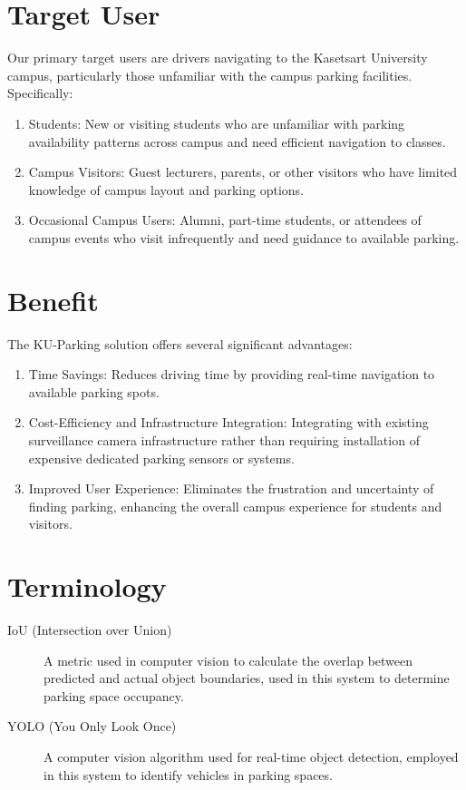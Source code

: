 \section{Target User}
\label{section:target-user}

Our primary target users are drivers navigating to the Kasetsart University campus, particularly those unfamiliar with the campus parking facilities. Specifically:
\begin{enumerate}[leftmargin=80pt]
\item Students: New or visiting students who are unfamiliar with parking availability patterns across campus and need efficient navigation to classes.
\item Campus Visitors: Guest lecturers, parents, or other visitors who have limited knowledge of campus layout and parking options.
\item Occasional Campus Users: Alumni, part-time students, or attendees of campus events who visit infrequently and need guidance to available parking.
\end{enumerate}
\section{Benefit}
\label{section:benefit}

The KU-Parking solution offers several significant advantages:

\begin{enumerate}[leftmargin=80pt]
    \item Time Savings: Reduces driving time by providing real-time navigation to available parking spots.
    
    \item Cost-Efficiency and Infrastructure Integration: Integrating with existing surveillance camera infrastructure rather than requiring installation of expensive dedicated parking sensors or systems.
    
    \item Improved User Experience: Eliminates the frustration and uncertainty of finding parking, enhancing the overall campus experience for students and visitors.
\end{enumerate}

\section{Terminology}
\label{section:terminology}

\begin{description} 
    \item[IoU (Intersection over Union)] A metric used in computer vision to calculate the overlap between predicted and actual object boundaries, used in this system to determine parking space occupancy.
    
    \item[YOLO (You Only Look Once)] A computer vision algorithm used for real-time object detection, employed in this system to identify vehicles in parking spaces.
\end{description}